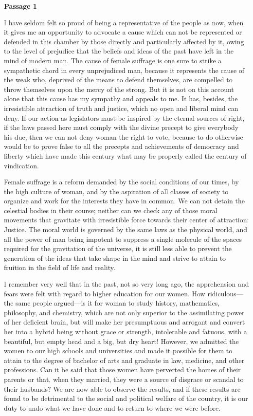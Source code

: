 \bigskip
\textbf{Passage 1}
\begin{linenumbers*}
\modulolinenumbers[5]
\indent

\indent I have seldom felt so proud of being a representative of the people as now, when it gives me an opportunity to advocate a cause which can not be represented or defended in this chamber by those directly and particularly affected by it, owing to the level of prejudice that the beliefs and ideas of the past have left in the mind of modern man. The cause of female suffrage is one sure to strike a sympathetic chord in every unprejudiced man, because it represents the cause of the weak who, deprived of the means to defend themselves, are compelled to throw themselves upon the mercy of the strong. But it is not on this account alone that this cause has my sympathy and appeals to me. It has, besides, the irresistible attraction of truth and justice, which no open and liberal mind can deny. If our action as legislators must be inspired by the eternal sources of right, if the laws passed here must comply with the divine precept to give everybody his due, then we can not deny woman the right to vote, because to do otherwise would be to prove false to all the precepts and achievements of democracy and liberty which have made this century what may be properly called the century of vindication.

\indent Female suffrage is a reform demanded by the social conditions of our times, by the high culture of woman, and by the aspiration of all classes of society to organize and work for the interests they have in common. We can not detain the celestial bodies in their course; neither can we check any of those moral movements that gravitate with irresistible force towards their center of attraction: Justice. The moral world is governed by the same laws as the physical world, and all the power of man being impotent to suppress a single molecule of the spaces required for the gravitation of the universe, it is still less able to prevent the generation of the ideas that take shape in the mind and strive to attain to fruition in the field of life and reality.

\indent I remember very well that in the past, not so very long ago, the apprehension and fears were felt with regard to higher education for our women. How ridiculous—the same people argued—is it for woman to study history, mathematics, philosophy, and chemistry, which are not only superior to the assimilating power of her deficient brain, but will make her presumptuous and arrogant and convert her into a hybrid being without grace or strength, intolerable and fatuous, with a beautiful, but empty head and a big, but dry heart! However, we admitted the women to our high schools and universities and made it possible for them to attain to the degree of bachelor of arts and graduate in law, medicine, and other professions. Can it be said that those women have perverted the homes of their parents or that, when they married, they were a source of disgrace or scandal to their husbands? We are now able to observe the results, and if these results are found to be detrimental to the social and political welfare of the country, it is our duty to undo what we have done and to return to where we were before.


\end{linenumbers*}
